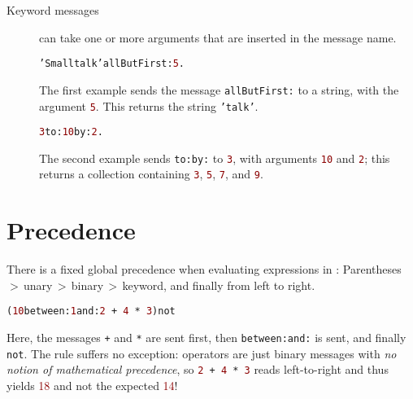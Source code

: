 \begin{description}
\item[Keyword messages] can take one or more arguments that are inserted in the message name.

\begin{alltt}
\textcolor{string}{'Smalltalk'} allButFirst: \textcolor{darkRed}{5}.
\end{alltt}

The first example sends the message \texttt{allButFirst:} to a string, with the argument \textcolor{darkRed}{\texttt{5}}.
This returns the string \textcolor{string}{\texttt{'talk'}}.

\begin{alltt}
\textcolor{darkRed}{3} to: \textcolor{darkRed}{10} by: \textcolor{darkRed}{2}.
\end{alltt}

The second example sends \texttt{to:by:} to \textcolor{darkRed}{\texttt{3}}, with arguments \textcolor{darkRed}{\texttt{10}} and \textcolor{darkRed}{\texttt{2}}; this returns a collection containing \textcolor{darkRed}{\texttt{3}}, \textcolor{darkRed}{\texttt{5}}, \textcolor{darkRed}{\texttt{7}}, and \textcolor{darkRed}{\texttt{9}}.

\end{description}


\section{Precedence}

There is a fixed global precedence when evaluating expressions in \PH: Parentheses\,$>$\,unary\,$>$\,binary\,$>$\,keyword, and finally from left to right.

\begin{alltt}
(\textcolor{darkRed}{10} between: \textcolor{darkRed}{1} and: \textcolor{darkRed}{2}\,+\,\textcolor{darkRed}{4}\,*\,\textcolor{darkRed}{3}) not
\end{alltt}

Here, the messages \texttt{+} and \texttt{*} are sent first, then \texttt{between:and:} is sent, and finally \texttt{not}.
The rule suffers no exception: operators are just binary messages with \emph{no notion of mathematical precedence}, so \texttt{\textcolor{darkRed}{2}\,+\,\textcolor{darkRed}{4}\,*\,\textcolor{darkRed}{3}} reads left-to-right and thus yields \textcolor{darkRed}{18} and not the expected \textcolor{darkRed}{14}!

